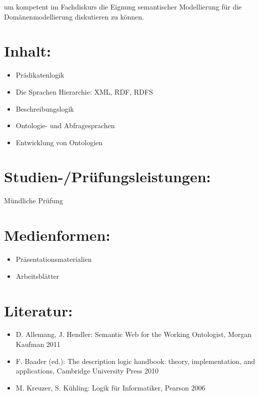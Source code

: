 um kompetent im Fachdiskurs die Eignung semantischer Modellierung für
die Domänenmodellierung diskutieren zu können.

\section*{Inhalt:}\label{inhalt-20}

\begin{itemize}
\tightlist
\item
  Prädikatenlogik
\item
  Die Sprachen Hierarchie: XML, RDF, RDFS
\item
  Beschreibungslogik
\item
  Ontologie- und Abfragesprachen
\item
  Entwicklung von Ontologien
\end{itemize}

\section*{Studien-/Prüfungsleistungen:}\label{studien-pruxfcfungsleistungen-20}

Mündliche Prüfung

\section*{Medienformen:}\label{medienformen-20}

\begin{itemize}
\tightlist
\item
  Präsentationsmaterialien
\item
  Arbeitsblätter
\end{itemize}

\section*{Literatur:}\label{literatur-20}

\begin{itemize}
\tightlist
\item
  D. Allemang, J. Hendler: Semantic Web for the Working Ontologist,
  Morgan Kaufman 2011
\item
  F. Baader (ed.): The description logic handbook: theory,
  implementation, and applications, Cambridge University Press 2010
\item
  M. Kreuzer, S. Kühling: Logik für Informatiker, Pearson 2006
\end{itemize}

